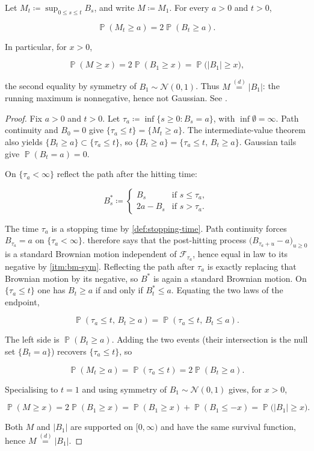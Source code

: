 \documentclass[11pt,a4paper]{article}
\DeclareMathOperator{\Pbb}{\mathbb{P}}
\begin{document}
\begin{theorem}
\label{thm:bm-reflection}
Let \(M_t\coloneqq\sup_{0\le s\le t}B_s\), and write \(M\coloneqq M_1\). For every \(a>0\) and \(t>0\),

\[
\Pbb(M_t\ge a)
=
2\Pbb(B_t\ge a).
\]

In particular, for \(x>0\),

\[
\Pbb(M\ge x)
=
2\Pbb(B_1\ge x)
=
\Pbb\bigl(|B_1|\ge x\bigr),
\]

the second equality by symmetry of \(B_1\sim\mathcal{N}(0,1)\). Thus \(M\stackrel{(d)}{=}|B_1|\): the running maximum is nonnegative, hence not Gaussian. See \citep[Chapter~8]{durrett2010}.
\end{theorem}

\begin{proof}
Fix \(a>0\) and \(t>0\). Let \(\tau_{a}\coloneqq\inf\{s\ge 0: B_{s}=a\}\), with \(\inf\emptyset=\infty\). Path continuity and \(B_{0}=0\) give \(\{\tau_{a}\le t\}=\{M_{t}\ge a\}\). The intermediate-value theorem also yields \(\{B_{t}\ge a\}\subset\{\tau_{a}\le t\}\), so \(\{B_{t}\ge a\}=\{\tau_{a}\le t,\, B_{t}\ge a\}\). Gaussian tails give \(\Pbb(B_{t}=a)=0\).

On \(\{\tau_{a}<\infty\}\) reflect the path after the hitting time:

\[
B^{*}_{s}
\coloneqq
\begin{cases}
B_{s} & \text{if }s\le\tau_{a},\\
2a-B_{s} & \text{if }s>\tau_{a}.
\end{cases}
\]

The time \(\tau_{a}\) is a stopping time by \cref{def:stopping-time}. Path continuity forces \(B_{\tau_{a}}=a\) on \(\{\tau_{a}<\infty\}\).  therefore says that the post-hitting process \(\bigl(B_{\tau_{a}+u}-a\bigr)_{u\ge 0}\) is a standard Brownian motion independent of \(\mathcal{F}_{\tau_{a}}\), hence equal in law to its negative by \cref{itm:bm-sym}. Reflecting the path after \(\tau_{a}\) is exactly replacing that Brownian motion by its negative, so \(B^{*}\) is again a standard Brownian motion. On \(\{\tau_{a}\le t\}\) one has \(B_{t}\ge a\) if and only if \(B^{*}_{t}\le a\). Equating the two laws of the endpoint,

\[
\Pbb(\tau_{a}\le t,\, B_{t}\ge a)
=
\Pbb(\tau_{a}\le t,\, B_{t}\le a).
\]

The left side is \(\Pbb(B_{t}\ge a)\). Adding the two events (their intersection is the null set \(\{B_{t}=a\}\)) recovers \(\{\tau_{a}\le t\}\), so

\[
\Pbb(M_{t}\ge a)
=
\Pbb(\tau_{a}\le t)
=
2\Pbb(B_{t}\ge a).
\]

Specialising to \(t=1\) and using symmetry of \(B_{1}\sim\mathcal{N}(0,1)\) gives, for \(x>0\),

\[
\Pbb(M\ge x)
=
2\Pbb(B_{1}\ge x)
=
\Pbb(B_{1}\ge x)+\Pbb(B_{1}\le -x)
=
\Pbb\bigl(|B_{1}|\ge x\bigr).
\]

Both \(M\) and \(|B_{1}|\) are supported on \([0,\infty)\) and have the same survival function, hence \(M\stackrel{(d)}{=}|B_{1}|\).
\end{proof}
\end{document}

